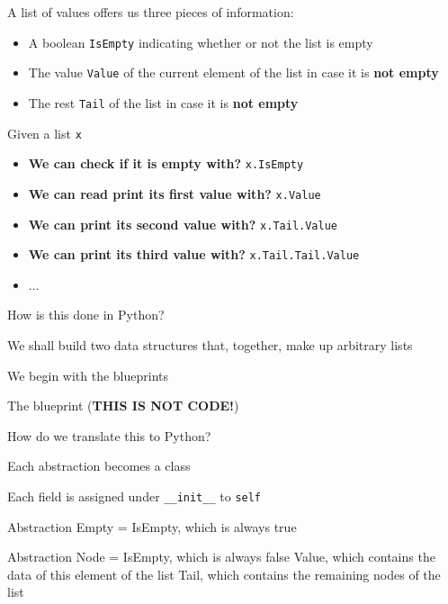 \documentclass{beamer}
\begin{document}
\begin{slide}{
\item A list of values offers us three pieces of information:
\begin{itemize}
\item A boolean \texttt{IsEmpty} indicating whether or not the list is empty
\item The value \texttt{Value} of the current element of the list in case it is \textbf{not empty}
\item The rest \texttt{Tail} of the list in case it is \textbf{not empty}
\end{itemize}
\item Given a list \texttt{x}
\begin{itemize}
\item \textbf{We can check if it is empty with?} \pause \texttt{x.IsEmpty}
\item \textbf{We can read print its first value with?} \pause \texttt{x.Value}
\item \textbf{We can print its second value with?} \pause \texttt{x.Tail.Value}
\item \textbf{We can print its third value with?} \pause \texttt{x.Tail.Tail.Value}
\item ...
\end{itemize}
}\end{slide}

\begin{slide}{
\item How is this done in Python?
\item We shall build two data structures that, together, make up arbitrary lists
\item We begin with the blueprints
}\end{slide}

\begin{frame}[fragile]{The blueprint (\textbf{THIS IS NOT CODE!})}
\begin{codewithblock}{\pause \item How do we translate this to Python? \pause \item Each abstraction becomes a class \item Each field is assigned under \texttt{\_\_init\_\_} to \texttt{self}}
Abstraction Empty =
  IsEmpty, which is always true

Abstraction Node = 
  IsEmpty, which is always false
  Value, which contains the data of this element of the list
  Tail, which contains the remaining nodes of the list
\end{codewithblock}
\end{frame}
\end{document}
